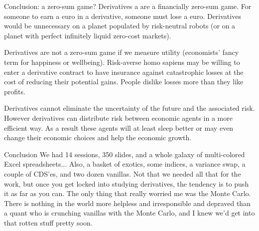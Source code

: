 \documentclass{beamer}
\begin{document}
\begin{frame}{Conclusion: a zero-sum game?}
\justify
Derivatives a are a \alert{financially} zero-sum game. For someone to earn a euro in a derivative, someone must lose a euro. Derivatives would be unnecessary on a planet populated by risk-neutral robots (or on a planet with perfect infinitely liquid zero-cost markets).

\justify
Derivatives are not a zero-sum game if we measure \alert{utility} (economists' fancy term for happiness or wellbeing).  Risk-averse homo sapiens may be willing to enter a derivative contract to have insurance against catastrophic losses at the cost of reducing their potential gains. People dislike losses more than they like profits. 

\justify
Derivatives cannot eliminate the uncertainty of the future and the associated risk. However derivatives can distribute risk between economic agents in a more efficient way. As a result these agents will at least sleep better or may even change their economic choices and help the economic growth.
\end{frame}



\begin{frame}{Conclusion}
\justify
We had 14 sessions, 350 slides, and a whole galaxy of multi-colored Excel spreadsheets... Also, a basket of exotics, some indices, a variance swap, a couple of CDS'es, and two dozen vanillas. Not that we needed all that for the work, but once you get locked into studying derivatives, the tendency is to push it as far as you can. The only thing that really worried me was the Monte Carlo. There is nothing in the world more helpless and irresponsible and depraved than a quant who is crunching vanillas with the Monte Carlo, and I knew we'd get into that rotten stuff pretty soon.
\end{frame}
\end{document}
